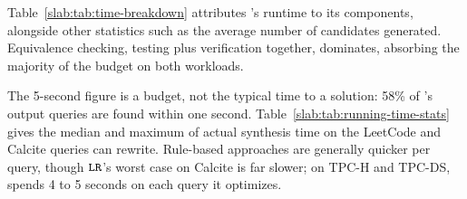 Table~\ref{slab:tab:time-breakdown} attributes \toolname's runtime to
its components, alongside other statistics such as the average number
of candidates generated. Equivalence checking, testing plus
verification together, dominates, absorbing the majority of the budget
on both workloads.

The 5-second figure is a budget, not the typical time to a solution:
58\% of \toolname's output queries are found within one second.
Table~\ref{slab:tab:running-time-stats} gives the median and maximum
of actual synthesis time on the LeetCode and Calcite queries \toolname
can rewrite. Rule-based approaches are generally quicker per query,
though $\texttt{LR}$'s worst case on Calcite is far slower; on TPC-H and
TPC-DS, \toolname spends 4 to 5 seconds on each query it optimizes.

